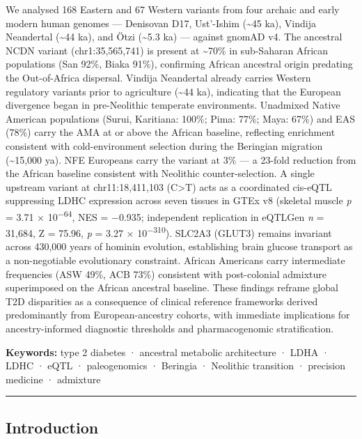 \documentclass[
  letterpaper,
  DIV=11,
  numbers=noendperiod]{scrartcl}
\begin{document}
We analysed 168 Eastern and 67 Western variants from four archaic and
early modern human genomes --- Denisovan D17, Ust'-Ishim
(\textasciitilde45 ka), Vindija Neandertal (\textasciitilde44 ka), and
Ötzi (\textasciitilde5.3 ka) --- against gnomAD v4. The ancestral NCDN
variant (chr1:35,565,741) is present at \textasciitilde70\% in
sub-Saharan African populations (San 92\%, Biaka 91\%), confirming
African ancestral origin predating the Out-of-Africa dispersal. Vindija
Neandertal already carries Western regulatory variants prior to
agriculture (\textasciitilde44 ka), indicating that the European
divergence began in pre-Neolithic temperate environments. Unadmixed
Native American populations (Surui, Karitiana: 100\%; Pima: 77\%; Maya:
67\%) and EAS (78\%) carry the AMA at or above the African baseline,
reflecting enrichment consistent with cold-environment selection during
the Beringian migration (\textasciitilde15,000 ya). NFE Europeans carry
the variant at 3\% --- a 23-fold reduction from the African baseline
consistent with Neolithic counter-selection. A single upstream variant
at chr11:18,411,103 (C\textgreater T) acts as a coordinated cis-eQTL
suppressing LDHC expression across seven tissues in GTEx v8 (skeletal
muscle \emph{p} = 3.71 × 10\textsuperscript{−64}, NES = −0.935;
independent replication in eQTLGen \emph{n} = 31,684, Z = 75.96,
\emph{p} = 3.27 × 10\textsuperscript{−310}). SLC2A3 (GLUT3) remains
invariant across 430,000 years of hominin evolution, establishing brain
glucose transport as a non-negotiable evolutionary constraint. African
Americans carry intermediate frequencies (ASW 49\%, ACB 73\%) consistent
with post-colonial admixture superimposed on the African ancestral
baseline. These findings reframe global T2D disparities as a consequence
of clinical reference frameworks derived predominantly from
European-ancestry cohorts, with immediate implications for
ancestry-informed diagnostic thresholds and pharmacogenomic
stratification.

\textbf{Keywords:} type 2 diabetes · ancestral metabolic architecture ·
LDHA · LDHC · eQTL · paleogenomics · Beringia · Neolithic transition ·
precision medicine · admixture

\hrule
\vspace{0.3cm}

\subsection{Introduction}\label{introduction}
\end{document}
